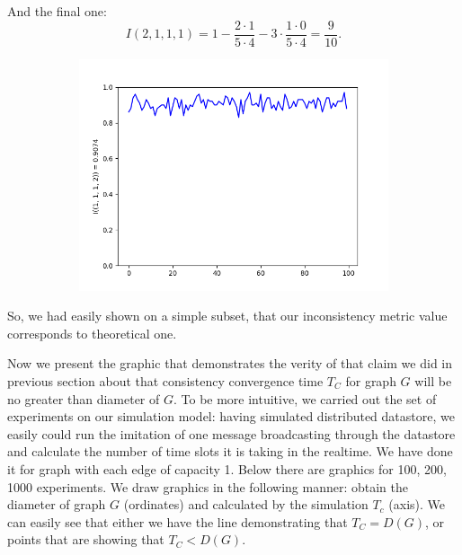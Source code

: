 \documentclass{llncs}
\begin{document}
And the final one:
\[I(2,1,1,1) = 1 - \frac{2 \cdot 1}{5 \cdot 4} - 3\cdot\frac{1 \cdot 0}{5 \cdot 4} = \frac{9}{10} .\]
\begin{figure}
\begin{subfigure}{0.5\linewidth}
\centering\includegraphics[scale=0.4]{images/1-1-1-2-consistent-partitions-probability.png}
\end{subfigure}
\end{figure}

So, we had easily shown on a simple subset, that our inconsistency metric value corresponds to theoretical one.



Now we present the graphic that demonstrates the verity of that claim we did in previous section about that
consistency convergence time $T_C$ for graph $G$ will be no greater than diameter of $G$.
To be more intuitive, we carried out the set of experiments on our simulation model: having simulated distributed datastore, we easily could run the imitation of one message broadcasting through the datastore and calculate the number of time slots it is taking in the realtime. We have done it for graph with each edge of capacity 1. Below there are graphics for 100, 200, 1000 experiments.
We draw graphics in the following manner: obtain the diameter of graph $G$ (ordinates) and calculated by the simulation $T_c$ (axis). We can easily see that either we have the line demonstrating that $T_C = D(G)$, or
points that are showing that $T_C < D(G)$.
\end{document}
